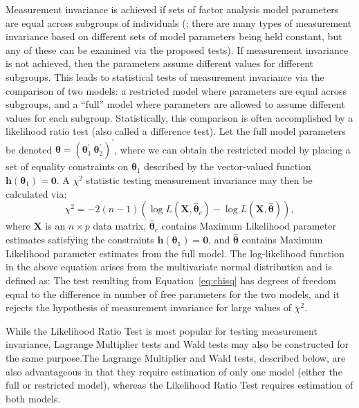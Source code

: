 \documentclass[man]{apa}
\begin{document}
Measurement invariance is achieved
if sets of factor analysis model parameters are equal across
subgroups of individuals 
(; there are many types of measurement invariance based
on different sets of model parameters being held constant, but any of these
can be examined via the proposed tests).  If measurement invariance is
not achieved, 
then the parameters assume different values for different
subgroups.  This leads to statistical tests of measurement
invariance via the comparison of two models: a restricted model where
parameters are equal across subgroups, and a ``full'' model
where parameters are allowed to assume different values for each
subgroup.  Statistically, this comparison is often 
accomplished by a likelihood ratio test (also called a
difference test).  Let the full model parameters be denoted 
${\bm \theta} = ({\bm \theta}_1^{\prime}\ {\bm
  \theta}_2^{\prime})^{\prime}$, where we can obtain the restricted model
by placing a set of equality constraints on ${\bm \theta}_1$ described
by the vector-valued function ${\bm
  h}({\bm \theta}_1) = {\bm 0}$.  A $\chi^2$ statistic testing
measurement invariance may then be calculated via:
\begin{equation}
    \label{eq:chisq}
 \chi^2 = -2(n-1)(\log L({\bm X},
\widehat{{\bm \theta}}_c) - \log L({\bm X},\widehat{{\bm \theta}})),
\end{equation}
where ${\bm{X}}$ is an $n \times p$ data matrix, $\widehat{\bm \theta}_c$
contains Maximum Likelihood parameter estimates satisfying the
constraints ${\bm h}({\bm \theta}_1) = {\bm 0}$, and $\widehat{\bm
  \theta}$ contains Maximum Likelihood parameter estimates from the
full model.  The log-likelihood function in the above equation arises
from the multivariate normal distribution and is defined as:
  The test resulting from
Equation~\eqref{eq:chisq} has 
degrees of freedom equal to the difference in number of free
parameters for the two models, and it rejects the hypothesis of measurement
invariance for large values of $\chi^2$.

While the Likelihood Ratio Test is most popular for testing
measurement invariance, Lagrange Multiplier tests and Wald tests
may also be constructed for the same purpose.The Lagrange Multiplier and Wald 
tests, described below, are also advantageous in that they require
estimation of only one 
model (either the full or restricted model), whereas the Likelihood
Ratio Test requires estimation of both models.
\end{document}
